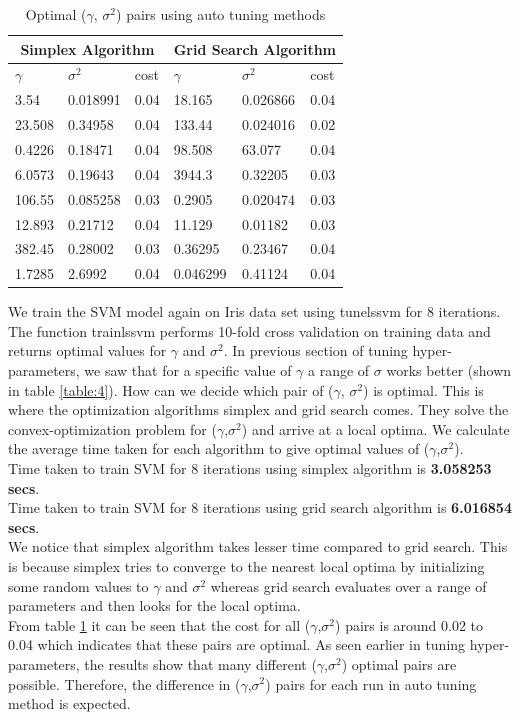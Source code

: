 \documentclass[12pt]{report}
\begin{document}
{\begin{table}
	\begin{tabular}{ |p{1.5cm}|p{1.5cm}|p{1.5cm}|p{1.5cm}|p{1.5cm}|p{1.5cm}| }
		\hline
		\multicolumn{3}{|c|}{Simplex Algorithm} &\multicolumn{3}{|c|}{Grid Search Algorithm}
\\ \hline	
	\cellcolor{blue!25}$\gamma$ &\cellcolor{blue!25}$\sigma^2$ & \cellcolor{blue!25}cost & \cellcolor{blue!25}$\gamma$ &\cellcolor{blue!25}$\sigma^2$ &\cellcolor{blue!25}cost \\ \hline
	 3.54 &0.018991 &0.04 &18.165  &0.026866 &0.04 \\ \hline
	23.508 &0.34958 &0.04 &133.44  &0.024016 &0.02 \\ \hline
	0.4226 &0.18471 &0.04 &98.508  &63.077   &0.04 \\ \hline
	6.0573 &0.19643 &0.04 &3944.3  &0.32205  &0.03 \\ \hline
	106.55 &0.085258 &0.03 &0.2905 &0.020474 &0.03 \\ \hline
	12.893 &0.21712 &0.04 &11.129  &0.01182  &0.03 \\ \hline
	382.45 &0.28002 &0.03 &0.36295 &0.23467  &0.04 \\ \hline
	1.7285 &2.6992 &0.04 &0.046299 &0.41124  &0.04 \\ \hline
	\end{tabular}
	\caption{Optimal ($\gamma$, $\sigma^2$) pairs using auto tuning methods}
	\label{table:5}
\end{table}

We train the SVM model again on Iris data set using tunelssvm for 8 iterations. The function trainlssvm performs 10-fold cross validation on training data and returns optimal values for $\gamma$ and $\sigma^2$. In previous section of tuning hyper-parameters, we saw that for a specific value of $\gamma$ a range of $\sigma$ works better (shown in table \ref{table:4}). How can we decide which pair of ($\gamma$, $\sigma^2$) is optimal. This is where the optimization algorithms simplex and grid search comes. They solve the convex-optimization problem for ($\gamma$,$\sigma^2$) and arrive at a local optima. We calculate the average time taken for each algorithm to give optimal values of ($\gamma$,$\sigma^2$). \\
Time taken to train SVM for 8 iterations using simplex algorithm is {\bf 3.058253 secs}.\\
Time taken to train SVM for 8 iterations using grid search algorithm is {\bf 6.016854 secs}.\\
We notice that simplex algorithm takes lesser time compared to grid search. This is because simplex tries to converge to the nearest local optima by initializing some random values to $\gamma$ and $\sigma^2$ whereas grid search evaluates over a range of parameters and then looks for the local optima.\\
From table \ref{table:5} it can be seen that the cost for all ($\gamma$,$\sigma^2$) pairs is around 0.02 to 0.04 which indicates that these pairs are optimal. As seen earlier in tuning hyper-parameters, the results show that many different ($\gamma$,$\sigma^2$) optimal pairs are possible. Therefore, the difference in ($\gamma$,$\sigma^2$) pairs for each run in auto tuning method is expected. 
}
\end{document}
